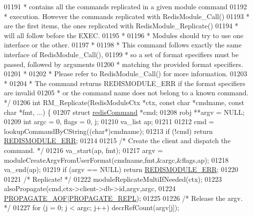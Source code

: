 \begin{DoxyCode}
{{{01191 \textcolor{comment}{ * contains all the commands replicated in a given module command}
01192 \textcolor{comment}{ * execution. However the commands replicated with RedisModule\_Call()}
01193 \textcolor{comment}{ * are the first items, the ones replicated with RedisModule\_Replicate()}
01194 \textcolor{comment}{ * will all follow before the EXEC.}
01195 \textcolor{comment}{ *}
01196 \textcolor{comment}{ * Modules should try to use one interface or the other.}
01197 \textcolor{comment}{ *}
01198 \textcolor{comment}{ * This command follows exactly the same interface of RedisModule\_Call(),}
01199 \textcolor{comment}{ * so a set of format specifiers must be passed, followed by arguments}
01200 \textcolor{comment}{ * matching the provided format specifiers.}
01201 \textcolor{comment}{ *}
01202 \textcolor{comment}{ * Please refer to RedisModule\_Call() for more information.}
01203 \textcolor{comment}{ *}
01204 \textcolor{comment}{ * The command returns REDISMODULE\_ERR if the format specifiers are invalid}
01205 \textcolor{comment}{ * or the command name does not belong to a known command. */}
01206 \textcolor{keywordtype}{int} RM\_Replicate(RedisModuleCtx *ctx, \textcolor{keyword}{const} \textcolor{keywordtype}{char} *cmdname, \textcolor{keyword}{const} \textcolor{keywordtype}{char} *fmt, ...) \{
01207     \textcolor{keyword}{struct} \hyperlink{structredisCommand}{redisCommand} *cmd;
01208     robj **argv = NULL;
01209     \textcolor{keywordtype}{int} argc = 0, flags = 0, j;
01210     va\_list ap;
01211 
01212     cmd = lookupCommandByCString((\textcolor{keywordtype}{char}*)cmdname);
01213     \textcolor{keywordflow}{if} (!cmd) \textcolor{keywordflow}{return} \hyperlink{redismodule_8h_a3df6f5bd5247289e66f44437a7cddd49}{REDISMODULE\_ERR};
01214 
01215     \textcolor{comment}{/* Create the client and dispatch the command. */}
01216     va\_start(ap, fmt);
01217     argv = moduleCreateArgvFromUserFormat(cmdname,fmt,&argc,&flags,ap);
01218     va\_end(ap);
01219     \textcolor{keywordflow}{if} (argv == NULL) \textcolor{keywordflow}{return} \hyperlink{redismodule_8h_a3df6f5bd5247289e66f44437a7cddd49}{REDISMODULE\_ERR};
01220 
01221     \textcolor{comment}{/* Replicate! */}
01222     moduleReplicateMultiIfNeeded(ctx);
01223     alsoPropagate(cmd,ctx->client->db->id,argv,argc,
01224         \hyperlink{server_8h_a542fb79924ca427c866fd63632f60777}{PROPAGATE\_AOF}|\hyperlink{server_8h_a59c6e025b4ed85642a0472fc3e73e298}{PROPAGATE\_REPL});
01225 
01226     \textcolor{comment}{/* Release the argv. */}
01227     \textcolor{keywordflow}{for} (j = 0; j < argc; j++) decrRefCount(argv[j]);
}}}
\end{DoxyCode}

